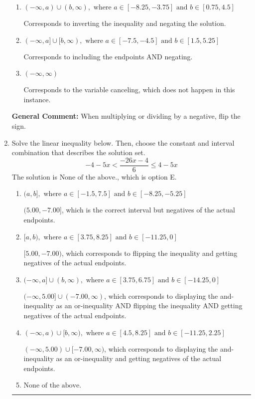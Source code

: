 \documentclass{extbook}[14pt]
\newcommand{\litem}[1]{\item #1

\rule{\textwidth}{0.4pt}}
\begin{document}
\begin{enumerate}
{\begin{enumerate}[label=\Alph*.]
Corresponds to including the endpoints (when they should be excluded).
\item \( (-\infty, a) \cup (b, \infty), \text{ where } a \in [-8.25, -3.75] \text{ and } b \in [0.75, 4.5] \)

Corresponds to inverting the inequality and negating the solution.
\item \( (-\infty, a] \cup [b, \infty), \text{ where } a \in [-7.5, -4.5] \text{ and } b \in [1.5, 5.25] \)

Corresponds to including the endpoints AND negating.
\item \( (-\infty, \infty) \)

Corresponds to the variable canceling, which does not happen in this instance.
\end{enumerate}

\textbf{General Comment:} When multiplying or dividing by a negative, flip the sign.
}
\litem{
Solve the linear inequality below. Then, choose the constant and interval combination that describes the solution set.
\[ -4 - 5 x < \frac{-26 x - 4}{6} \leq 4 - 5 x \]The solution is \( \text{None of the above.} \), which is option E.\begin{enumerate}[label=\Alph*.]
\item \( (a, b], \text{ where } a \in [-1.5, 7.5] \text{ and } b \in [-8.25, -5.25] \)

$(5.00, -7.00]$, which is the correct interval but negatives of the actual endpoints.
\item \( [a, b), \text{ where } a \in [3.75, 8.25] \text{ and } b \in [-11.25, 0] \)

$[5.00, -7.00)$, which corresponds to flipping the inequality and getting negatives of the actual endpoints.
\item \( (-\infty, a] \cup (b, \infty), \text{ where } a \in [3.75, 6.75] \text{ and } b \in [-14.25, 0] \)

$(-\infty, 5.00] \cup (-7.00, \infty)$, which corresponds to displaying the and-inequality as an or-inequality AND flipping the inequality AND getting negatives of the actual endpoints.
\item \( (-\infty, a) \cup [b, \infty), \text{ where } a \in [4.5, 8.25] \text{ and } b \in [-11.25, 2.25] \)

$(-\infty, 5.00) \cup [-7.00, \infty)$, which corresponds to displaying the and-inequality as an or-inequality and getting negatives of the actual endpoints.
\item \( \text{None of the above.} \)


\end{enumerate}}
\end{enumerate}
\end{document}
